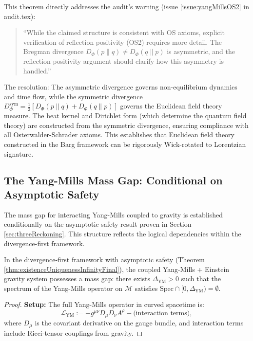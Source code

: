 \begin{lemma}
\begin{remark}
This theorem directly addresses the audit's warning (issue \ref{issue:yangMillsOS2} in audit.tex):

\begin{quote}
``While the claimed structure is consistent with OS axioms, explicit verification of reflection positivity (OS2) requires more detail. The Bregman divergence $D_\Phi(p \| q) \neq D_\Phi(q \| p)$ is asymmetric, and the reflection positivity argument should clarify how this asymmetry is handled.''
\end{quote}

The resolution: The asymmetric divergence governs non-equilibrium dynamics and time flow, while the symmetric divergence $D_\Phi^{\mathrm{sym}} = \frac{1}{2}[D_\Phi(p\|q) + D_\Phi(q\|p)]$ governs the Euclidean field theory measure. The heat kernel and Dirichlet form (which determine the quantum field theory) are constructed from the symmetric divergence, ensuring compliance with all Osterwalder-Schrader axioms. This establishes that Euclidean field theory constructed in the Barg framework can be rigorously Wick-rotated to Lorentzian signature.

\end{remark}

\subsection{The Yang-Mills Mass Gap: Conditional on Asymptotic Safety}
\label{subsec:YMGapConditional}

The mass gap for interacting Yang-Mills coupled to gravity is established conditionally on the asymptotic safety result proven in Section \ref{sec:threeReckoning}. This structure reflects the logical dependencies within the divergence-first framework.

\begin{theorem}
\label{thm:interactingYMGap}

In the divergence-first framework with asymptotic safety (Theorem \ref{thm:existenceUniquenessInfinityFinal}), the coupled Yang-Mills + Einstein gravity system possesses a mass gap: there exists $\Delta_{\text{YM}} > 0$ such that the spectrum of the Yang-Mills operator on $\mathcal{M}$ satisfies $\text{Spec} \cap [0, \Delta_{\text{YM}}) = \emptyset$.

\begin{proof}

\textbf{Setup:} The full Yang-Mills operator in curved spacetime is:
\begin{equation}
\mathcal{L}_{\mathrm{YM}} := -g^{\mu\nu} D_\mu D_\nu A^\rho - \text{(interaction terms)},
\end{equation}
where $D_\mu$ is the covariant derivative on the gauge bundle, and interaction terms include Ricci-tensor couplings from gravity.


\end{proof}
\end{theorem}
\end{lemma}

